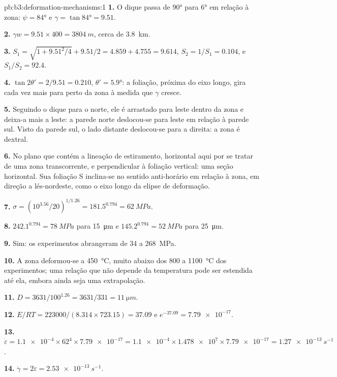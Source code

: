 \begin{solution}{pb:b3:deformation-mechanisms:1}
\textbf{1.} O dique passa de \ang{90} para \ang{6} em relação à zona: $\psi =
\ang{84}$ e $\gamma = \tan\ang{84} = 9.51$.

\textbf{2.} $\gamma w = 9.51\times400 = \qty{3804}{m}$, cerca de \qty{3.8}{km}.

\textbf{3.} $S_1 = \sqrt{1 + 9.51^2/4} + 9.51/2 = 4.859 + 4.755 = 9.614$,
$S_2 = 1/S_1 = 0.104$, e $S_1/S_2 = 92.4$.

\textbf{4.} $\tan2\theta' = 2/9.51 = 0.210$, $\theta' = \ang{5.9}$: a
foliação, próxima do eixo longo, gira cada vez mais para perto da zona à medida
que $\gamma$ cresce.

\textbf{5.} Seguindo o dique para o norte, ele é arrastado para leste dentro da zona e
deixa-a mais a leste: a parede norte deslocou-se para leste em relação à parede sul.
Visto da parede sul, o lado distante deslocou-se para a direita: a zona é
dextral.

\textbf{6.} No plano que contém a lineação de estiramento, horizontal aqui
por se tratar de uma zona transcorrente, e perpendicular à foliação vertical: uma
seção horizontal. Sua foliação S inclina-se no sentido anti-horário em relação à zona,
em direção a lés-nordeste, como o eixo longo da elipse de deformação.

\textbf{7.} $\sigma = (10^{3.56}/20)^{1/1.26} = 181.5^{0.794} = \qty{62}{MPa}$.

\textbf{8.} $242.1^{0.794} = \qty{78}{MPa}$ para \qty{15}{\micro m} e
$145.2^{0.794} = \qty{52}{MPa}$ para \qty{25}{\micro m}.

\textbf{9.} Sim: os experimentos abrangeram de 34 a \qty{268}{MPa}.

\textbf{10.} A zona deformou-se a \qty{450}{\celsius}, muito abaixo dos 800 a
\qty{1100}{\celsius} dos experimentos; uma relação que não depende da
temperatura pode ser estendida até ela, embora ainda seja uma
extrapolação.

\textbf{11.} $D = 3631/100^{1.26} = 3631/331 = \qty{11}{\micro m}$.

\textbf{12.} $E/RT = 223000/(8.314\times723.15) = 37.09$ e $e^{-37.09} =
\num{7.79e-17}$.

\textbf{13.} $\dot\varepsilon = \num{1.1e-4}\times62^4\times\num{7.79e-17} =
\num{1.1e-4}\times\num{1.478e7}\times\num{7.79e-17} = \qty{1.27e-13}{s^{-1}}$.

\textbf{14.} $\dot\gamma = 2\dot\varepsilon = \qty{2.53e-13}{s^{-1}}$.


\end{solution}
